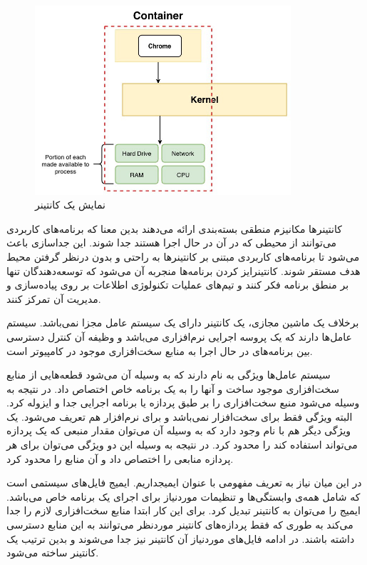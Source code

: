 \begin{figure}[!h]
	\centering
	\includegraphics[height=7cm]{images/container}
	\caption{نمایش یک کانتینر}
	\label{container}
\end{figure}

کانتینرها مکانیزم منطقی بسته‌بندی ارائه می‌دهند بدین معنا که برنامه‌های کاربردی می‌توانند از محیطی که در آن در حال اجرا هستند جدا شوند. این جداسازی باعث می‌شود تا برنامه‌های کاربردی مبتنی بر کانتینرها به راحتی و بدون درنظر گرفتن محیط هدف مستقر شوند. کانتینرایز کردن برنامه‌ها منجربه آن می‌شود که توسعه‌دهندگان تنها بر منطق برنامه فکر کنند و تیم‌های عملیات تکنولوژی اطلاعات بر روی پیاده‌سازی و مدیریت آن تمرکز کنند.

برخلاف یک ماشین مجازی، یک کانتینر دارای یک سیستم عامل مجزا نمی‌باشد. سیستم عامل‌ها
دارند که یک پروسه اجرایی نرم‌افزاری می‌باشد و وظیفه آن کنترل دسترسی بین برنامه‌های در حال اجرا به منابع سخت‌افزاری موجود در کامپیوتر است.

سیستم عامل‌ها ویژگی به نام
دارند که به وسیله آن می‌شود قطعه‌هایی از منابع سخت‌افزاری موجود ساخت و آنها را به یک برنامه خاص اختصاص داد. در نتیجه به وسیله
می‌شود منبع سخت‌افزاری را بر طبق  پردازه یا برنامه اجرایی جدا و ایزوله کرد. البته ویژگی
فقط برای سخت‌افزار نمی‌باشد و برای نرم‌افزار هم تعریف می‌شود. یک ویژگی دیگر هم با نام
وجود دارد که به وسیله آن می‌توان مقدار منبعی که یک پردازه می‌تواند استفاده کند را محدود کرد. در نتیجه به وسیله این دو ویژگی می‌توان برای هر پردازه منابعی را اختصاص داد و آن منابع را محدود کرد. 

در این میان نیاز به تعریف مفهومی با عنوان ایمیجداریم. ایمیج فایل‌های سیستمی است که شامل همه‌ی وابستگی‌ها و تنظیمات موردنیاز برای اجرای یک برنامه خاص می‌باشد. ایمیج را می‌توان به کانتینر تبدیل کرد. برای این کار ابتدا
منابع سخت‌افزاری لازم را جدا می‌کند به طوری که فقط پردازه‌های کانتینر موردنظر می‌توانند به این منابع دسترسی داشته باشند. در ادامه فایل‌های موردنیاز آن کانتینر نیز جدا می‌شوند و بدین ترتیب یک کانتینر ساخته می‌شود.


